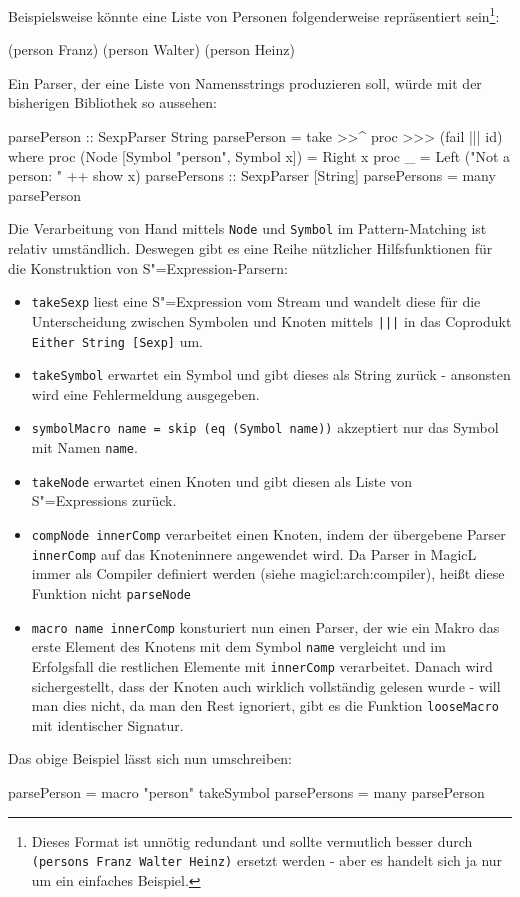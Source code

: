\documentclass[11pt, a4paper, bibgerm]{book}
\newcommand\icode[1]{\lstinline?#1?}
\newcommand\sref{}
\newcommand{\sexp}{S"=Expression}
\newcommand{\sexps}{S"=Expressions}
\begin{document}
Beispielsweise könnte eine Liste von Personen folgenderweise
repräsentiert sein\footnote{Dieses Format ist unnötig redundant und
  sollte vermutlich besser durch \icode{(persons Franz Walter Heinz)} ersetzt
  werden - aber es handelt sich ja nur um ein einfaches Beispiel.}:
\begin{code}
(person Franz)
(person Walter)
(person Heinz)
\end{code}

Ein Parser, der eine Liste von Namensstrings produzieren soll, würde mit
der bisherigen Bibliothek so aussehen:

\begin{code}
parsePerson :: SexpParser String
parsePerson = take >>^ proc >>> (fail ||| id)
  where proc (Node [Symbol "person", Symbol x]) = Right x
        proc _ = Left ("Not a person: " ++ show x)
parsePersons :: SexpParser [String]
parsePersons = many parsePerson
\end{code} %

Die Verarbeitung von Hand mittels \icode{Node} und \icode{Symbol} im
Pattern-Matching ist relativ umständlich. Deswegen gibt es eine Reihe
nützlicher Hilfsfunktionen für die Konstruktion von \sexp{}-Parsern:

\begin{itemize}
\item \icode{takeSexp} liest eine \sexp{} vom Stream und wandelt diese
  für die Unterscheidung zwischen Symbolen und Knoten mittels
  \icode{|||} in das Coprodukt \icode{Either String [Sexp]} um.
\item \icode{takeSymbol} erwartet ein Symbol und gibt dieses als String
  zurück - ansonsten wird eine Fehlermeldung ausgegeben.
\item \icode{symbolMacro name = skip (eq (Symbol name))} akzeptiert nur
  das Symbol mit Namen \icode{name}.
\item \icode{takeNode} erwartet einen Knoten und gibt diesen als Liste
  von \sexps{} zurück.
\item \icode{compNode innerComp} verarbeitet einen Knoten, indem der
  übergebene Parser \icode{innerComp} auf das Knoteninnere angewendet
  wird. Da Parser in MagicL immer als Compiler definiert werden (siehe
  \sref{magicl:arch:compiler}), heißt diese Funktion nicht \icode{parseNode}
\item \icode{macro name innerComp} %
  konsturiert nun einen Parser, der wie ein Makro das erste Element des
  Knotens mit dem Symbol \icode{name} vergleicht und im Erfolgsfall die
  restlichen Elemente mit \icode{innerComp} verarbeitet. Danach wird
  sichergestellt, dass der Knoten auch wirklich vollständig gelesen
  wurde - will man dies nicht, da man den Rest ignoriert, gibt es die
  Funktion \icode{looseMacro} mit identischer Signatur.
\end{itemize}
Das obige Beispiel lässt sich nun umschreiben:
\begin{code}
parsePerson  = macro "person" takeSymbol
parsePersons = many parsePerson
\end{code}
\end{document}

